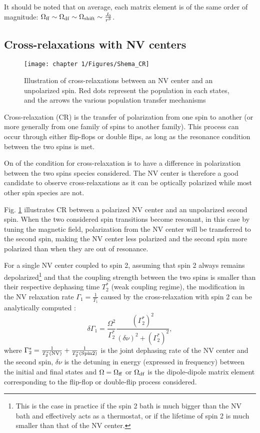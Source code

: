 \documentclass[a4paper, 11pt]{report}
\begin{document}
It should be noted that on average, each matrix element is of the same order of magnitude: $\Omega_{\rm ff} \sim \Omega_{\rm df} \sim \Omega_{\rm shift} \sim \frac{J_0}{r^3}$. 

\subsection{Cross-relaxations with NV centers}
\label{Sec_CR}
\begin{figure}[h]
\centering
\texttt{[image: chapter 1/Figures/Shema\_CR]}
\caption{Illustration of cross-relaxations between an NV center and an unpolarized spin. Red dots represent the population in each states, and the arrows the various population transfer mechanisms}
\label{CR_shema}
\end{figure}

Cross-relaxation (CR) is the transfer of polarization from one spin to another (or more generally from one family of spins to another family). This process can occur through either flip-flops or double flips, as long as the resonance condition between the two spins is met. 

On of the condition for cross-relaxation is to have a difference in polarization between the two spins species considered. The NV center is therefore a good candidate to observe cross-relaxations as it can be optically polarized while most other spin species are not. 

Fig. \ref{CR_shema} illustrates CR between a polarized NV center and an unpolarized second spin. When the two considered spin transitions become resonant, in this case by tuning the magnetic field, polarization from the NV center will be transferred to the second spin, making the NV center less polarized and the second spin more polarized than when they are out of resonance. 

For a single NV center coupled to spin 2, assuming that spin 2 always remains depolarized\footnote{This is the case in practice if the spin 2 bath is much bigger than the NV bath and effectively acts as a thermostat, or if the lifetime of spin 2 is much smaller than that of the NV center.} and that the coupling strength between the two spins is smaller than their respective dephasing time $T_2^*$ (weak coupling regime), the modification in the NV relaxation rate $\Gamma_1=\frac{1}{T_1}$ caused by the cross-relaxation with spin 2 can be analytically computed \citep{hall2016detection}:
\begin{equation}
\delta \Gamma_1=\frac{\Omega^2}{\Gamma_2^*} \frac{(\Gamma_2^*)^2}{(\delta \nu)^2+(\Gamma_2^*)^2},
\label{delta gamma 1}
\end{equation}
where $\Gamma_2^*=\frac{1}{T_2^*(\rm NV)}+\frac{1}{T_2^*(\rm Spin 2)}$ is the joint dephasing rate of the NV center and the second spin, $\delta \nu$ is the detuning in energy (expressed in frequency) between the initial and final states and $\Omega=\Omega_{\rm ff}$ or $\Omega_{\rm df}$ is the dipole-dipole matrix element corresponding to the flip-flop or double-flip process considered. 
\end{document}
